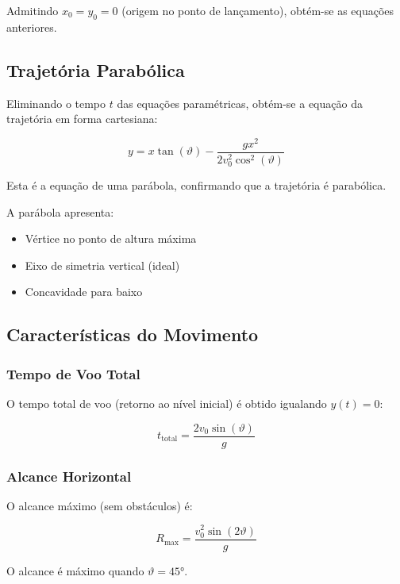 \documentclass[12pt,a4paper]{article}
\begin{document}
Admitindo $x_0 = y_0 = 0$ (origem no ponto de lançamento), obtém-se as equações anteriores.

\subsection{Trajetória Parabólica}

Eliminando o tempo $t$ das equações paramétricas, obtém-se a equação da trajetória em forma cartesiana:

\begin{equation}
y = x \tan(\vartheta) - \frac{g x^2}{2v_0^2 \cos^2(\vartheta)}
\end{equation}

Esta é a equação de uma parábola, confirmando que a trajetória é parabólica.

A parábola apresenta:
\begin{itemize}
    \item Vértice no ponto de altura máxima
    \item Eixo de simetria vertical (ideal)
    \item Concavidade para baixo
\end{itemize}

\subsection{Características do Movimento}

\subsubsection{Tempo de Voo Total}

O tempo total de voo (retorno ao nível inicial) é obtido igualando $y(t) = 0$:

\begin{equation}
t_{\text{total}} = \frac{2v_0 \sin(\vartheta)}{g}
\end{equation}

\subsubsection{Alcance Horizontal}

O alcance máximo (sem obstáculos) é:

\begin{equation}
R_{\text{max}} = \frac{v_0^2 \sin(2\vartheta)}{g}
\end{equation}

O alcance é máximo quando $\vartheta = 45°$.
\end{document}
